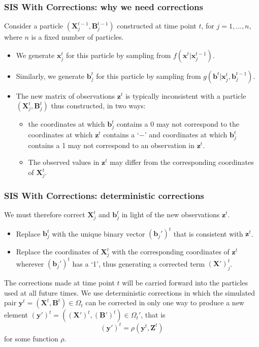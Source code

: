 \documentclass[9pt, xcolor={dvipsnames,svgnames,table}]{beamer}
\begin{document}
\begin{frame}
    \frametitle{SIS With Corrections: why we need corrections}
    Consider a particle $(\bm{X}^{t-1}_j,\bm{B}^{t-1}_j)$ constructed at time point $t$, for $j = 1, \ldots, n$, where $n$ is a fixed number of particles.
    \begin{itemize}
        \item We generate $\bm{x}^t_j$ for this particle by sampling from $f(\bm{x}^t | \bm{x}^{t-1}_j)$.
        \item Similarly, we generate $\bm{b}^{t}_j$ for this particle by sampling from $g(\bm{b}^{t} | \bm{x}^t_j, \bm{b}^{t-1}_j)$.
        \item The new matrix of observations $\bm{z}^{t}$ is typically inconsistent with a particle $(\bm{X}^{t}_j, \bm{B}^{t}_j)$ thus constructed, in two ways:
        \begin{itemize}
            \item the coordinates at which $\bm{b}^{t}_j$ contains a 0 may not correspond to the coordinates at which $\bm{z}^{t}$ contains a `$-$' and coordinates at which $\bm{b}^{t}_j$ contains a 1 may not correspond to an observation in $\bm{z}^{t}$.
            \item The observed values in $\bm{z}^{t}$ may differ from the corresponding coordinates of $\bm{X}^{t}_j$.
        \end{itemize}
    \end{itemize}
\end{frame}
    
    
    
    
    
    
\begin{frame}
    \frametitle{SIS With Corrections: deterministic corrections}
    We must therefore correct $\bm{X}^{t}_j$ and $\bm{b}^{t}_j$ in light of the new observations $\bm{z}^{t}$. 
    \begin{itemize}
        \item Replace $\bm{b}^{t}_j$ with the unique binary vector $(\bm{b}_j')^{t}$ that is consistent with $\bm{z}^{t}$.
        \item Replace the coordinates of $\bm{X}^{t}_j$ with the corresponding coordinates of $\bm{z}^{t}$ wherever $(\bm{b}_j')^{t}$ has a `1', thus generating a corrected term $\bm{(X')}^{t}_j$.
    \end{itemize}  
    The corrections made at time point $t$ will be carried forward into the particles used at all future times. 
    We use deterministic corrections in which the simulated pair $\bm{y}^{t} = (\bm{X}^{t}, \bm{B}^{t}) \in \Omega_t$ can be corrected in only one way to produce a new element $\bm{(y')}^{t} = (\bm{(X')}^t, \bm{(B')}^t) \in \Omega_t'$, that is
    \begin{equation*}
        \bm{(y')}^{t} = \rho(\bm{y}^{t},\bm{Z}^{t})
    \end{equation*}
    for some function $\rho$.
\end{frame}
\end{document}
